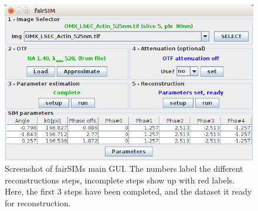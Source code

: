\documentclass[twoside=false,
           twocolumn=false,
           a4paper,DIV=15,
           10pt]{scrartcl}
\begin{document}
\begin{figure}
\begin{center}
\includegraphics[width=.7\textwidth]{../figures/fairSIM-screenshot}
\end{center}
\caption{Screenshot of fairSIMs main GUI. The numbers label the different
reconstructions steps, incomplete steps show up with red labels. Here,
the first 3 steps have been completed, and the dataset it ready for
reconstruction.}
\label{fig-gui}
\end{figure}
\end{document}
